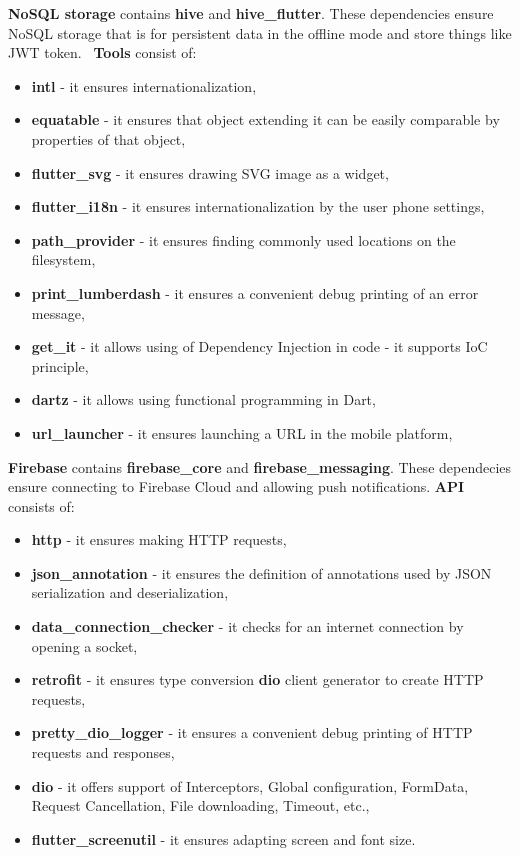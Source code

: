 \textbf{NoSQL storage} contains \textbf{hive} and \textbf{hive\_flutter}.
These dependencies ensure NoSQL storage that is for persistent data in the offline mode and store things like JWT token.~\cite{jwtToken}
\newline
\newline
\textbf{Tools} consist of:
\begin{itemize}
    \item \textbf{intl} - it ensures internationalization,
    \item \textbf{equatable} - it ensures that object extending it can be easily comparable by properties of that object,
    \item \textbf{flutter\_svg} - it ensures drawing SVG image as a widget,
    \item \textbf{flutter\_i18n} - it ensures internationalization by the user phone settings,
    \item \textbf{path\_provider} - it ensures finding commonly used locations on the filesystem,
    \item \textbf{print\_lumberdash} - it ensures a convenient debug printing of an error message,
    \item \textbf{get\_it} - it allows using of Dependency Injection in code - it supports IoC principle,~\cite{iocPrinciple}
    \item \textbf{dartz} - it allows using functional programming in Dart,
    \item \textbf{url\_launcher} - it ensures launching a URL in the mobile platform,
\end{itemize}
\textbf{Firebase} contains \textbf{firebase\_core} and \textbf{firebase\_messaging}.
These dependecies ensure connecting to Firebase Cloud and allowing push notifications.
\newline
\newline
\textbf{API} consists of:
\begin{itemize}
    \item \textbf{http} - it ensures making HTTP requests,
    \item \textbf{json\_annotation} - it ensures the definition of annotations used by JSON serialization and deserialization,
    \item \textbf{data\_connection\_checker} - it checks for an internet connection by opening a socket,
    \item \textbf{retrofit} - it ensures type conversion \textbf{dio} client generator to create HTTP requests,
    \item \textbf{pretty\_dio\_logger} - it ensures a convenient debug printing of HTTP requests and responses,
    \item \textbf{dio} - it offers support of Interceptors, Global configuration, FormData, Request Cancellation, File downloading, Timeout, etc.,
    \item \textbf{flutter\_screenutil} - it ensures adapting screen and font size.
\end{itemize}
